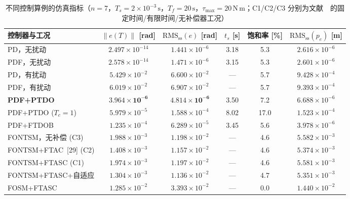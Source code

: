 \begin{table}[!ht]
\centering
\footnotesize
\setlength{\tabcolsep}{3pt}
\caption{不同控制算例的仿真指标（\(n=7\)，\(T_s=2\times10^{-3}\,\mathrm{s}\)，\(T_f=20\,\mathrm{s}\)，\(\tau_{\max}=20\,\mathrm{N\,m}\)；C1/C2/C3 分别为文献~\cite{dou2025fractional}~的固定时间/有限时间/无补偿器工况）}
\label{tab:sim_metrics}
\begin{tabular}{lccccc}
\toprule
控制器与工况 & \(\|e(T)\|\) [rad] & \(\mathrm{RMS_{ss}}(e)\) [rad] & \(t_s\) [s] & 饱和率 [\%] & \(\mathrm{RMS_{ss}}(p_e)\) [m] \\
\midrule
PD，无扰动            & \(2.497\times10^{-14}\) & \(1.441\times10^{-6}\) & 3.18 & 5.3 & \(2.616\times10^{-6}\) \\
PDF，无扰动           & \(2.578\times10^{-14}\) & \(1.471\times10^{-6}\) & 3.15 & 5.3 & \(2.601\times10^{-6}\) \\
PD，有扰动            & \(5.429\times10^{-2}\) & \(6.600\times10^{-2}\) & --- & 5.7 & \(9.428\times10^{-4}\) \\
PDF，有扰动           & \(6.019\times10^{-2}\) & \(6.907\times10^{-2}\) & --- & 5.7 & \(9.393\times10^{-4}\) \\
\textbf{PDF+PTDO} & \(\bm{3.964\times10^{-6}}\) & \(\bm{4.814\times10^{-6}}\) & 3.50 & 7.2 & \(6.688\times10^{-6}\) \\
PDF+PTDO (\(T_c{=}1\)) & \(5.979\times10^{-5}\) & \(1.588\times10^{-4}\) & 8.02 & 17.0 & \(1.523\times10^{-4}\) \\
PDF+FTDOB~\cite{dou2025fractional}& \(1.235\times10^{-4}\) & \(6.289\times10^{-5}\) & 3.45 & 5.6 & \(3.978\times10^{-6}\) \\
\midrule
FONTSM，无补偿 (C3) & \(1.988\times10^{-3}\) & \(1.198\times10^{-2}\) & --- & 4.6 & \(5.582\times10^{-3}\) \\
FONTSM+FTAC~[29] (C2) & \(1.408\times10^{-3}\) & \(1.157\times10^{-2}\) & --- & 4.6 & \(5.374\times10^{-3}\) \\
FONTSM+FTASC (C1) & \(1.974\times10^{-3}\) & \(1.197\times10^{-2}\) & --- & 4.6 & \(5.581\times10^{-3}\) \\
FONTSM+FTASC+自适应 & \(1.304\times10^{-3}\) & \(1.136\times10^{-2}\) & --- & 4.7 & \(5.351\times10^{-3}\) \\
FOSM+FTASC & \(1.285\times10^{-2}\) & \(3.393\times10^{-2}\) & --- & 0.0 & \(1.440\times10^{-2}\) \\
\bottomrule
\end{tabular}
\end{table}

